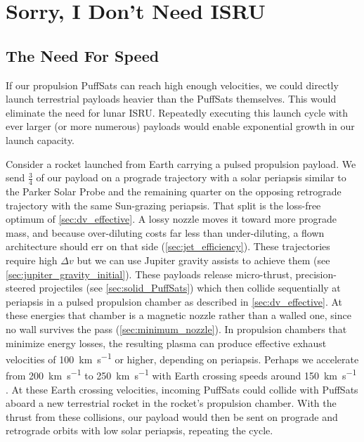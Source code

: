 \documentclass{article}
\newcommand{\deltav}{\Delta v}
\begin{document}
\section{Sorry, I Don't Need ISRU}\label{sec:sorry_isru}
\subsection{The Need For Speed} \label{sec:no_isru_rocket}\cite{topgun1986needforspeed}
If our propulsion PuffSats can reach high enough velocities, we could directly launch terrestrial payloads heavier than the PuffSats themselves.   This would eliminate the need for lunar ISRU. Repeatedly executing this launch cycle with ever larger (or more numerous) payloads would enable exponential growth in our launch capacity.

Consider a rocket launched from Earth carrying a pulsed propulsion payload.   We send $\frac{3}{4}$ of our payload on a prograde trajectory with a solar periapsis similar to the Parker Solar Probe and the remaining quarter on the opposing retrograde trajectory with the same Sun-grazing periapsis.  That split is the loss-free optimum of \autoref{sec:dv_effective}.  A lossy nozzle moves it toward more prograde mass, and because over-diluting costs far less than under-diluting, a flown architecture should err on that side (\autoref{sec:jet_efficiency}).  These trajectories require high $\deltav$ but we can use Jupiter gravity assists to achieve them (see \autoref{sec:jupiter_gravity_initial}).   These payloads release micro-thrust, precision-steered projectiles (see \autoref{sec:solid_PuffSats}) which then collide sequentially at periapsis in a pulsed propulsion chamber as described in \autoref{sec:dv_effective}. At these energies that chamber is a magnetic nozzle rather than a walled one, since no wall survives the pass (\autoref{sec:minimum_nozzle}). In propulsion chambers that minimize energy losses, the resulting plasma can produce effective exhaust velocities of \SI{100}{\kilo\meter\per\second} or higher, depending on periapsis. Perhaps we accelerate from \SI{200}{\kilo\meter\per\second} to \SI{250}{\kilo\meter\per\second} with Earth crossing speeds around \SI{150}{\kilo\meter\per\second} \cite{Katz_aim_is_all_you_need_2025}.  At these Earth crossing velocities, incoming PuffSats could collide with PuffSats aboard a new terrestrial rocket in the rocket's propulsion chamber.  With the thrust from these collisions, our payload would then be sent on prograde and retrograde orbits with low solar periapsis, repeating the cycle.
\end{document}
